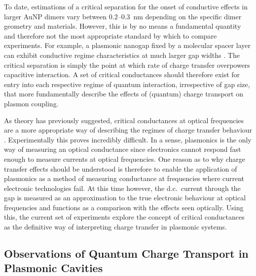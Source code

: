 \documentclass[a4paper, 11pt]{article}
\begin{document}
To date, estimations of a critical separation for the onset of conductive effects in larger AuNP dimers vary between 0.2--\SI{0.3}{nm} \cite{zuloaga2009, esteban2012, savage2012, scholl2013, esteban2015} depending on the specific dimer geometry and materials. However, this is by no means a fundamental quantity and therefore not the most appropriate standard by which to compare experiments. For example, a plasmonic nanogap fixed by a molecular spacer layer can exhibit conductive regime characteristics at much larger gap widths \cite{tan2014, hajisalem2014}. The critical separation is simply the point at which rate of charge transfer overpowers capacitive interaction. A set of critical conductances should therefore exist for entry into each respective regime of quantum interaction, irrespective of gap size, that more fundamentally describe the effects of (quantum) charge transport on plasmon coupling.

As theory has previously suggested, critical conductances at optical frequencies are a more appropriate way of describing the regimes of charge transfer behaviour \cite{perez2011, benz2014}. Experimentally this proves incredibly difficult. In a sense, plasmonics is the only way of measuring an optical conductance since electronics cannot respond fast enough to measure currents at optical frequencies. One reason as to why charge transfer effects should be understood is therefore to enable the application of plasmonics as a method of measuring conductance at frequencies where current electronic technologies fail. At this time however, the d.c.\ current through the gap is measured as an approximation to the true electronic behaviour at optical frequencies and functions as a comparison with the effects seen optically. Using this, the current set of experiments explore the concept of critical conductances as the definitive way of interpreting charge transfer in plasmonic systems.

\subsection{Observations of Quantum Charge Transport in Plasmonic Cavities}
\end{document}
